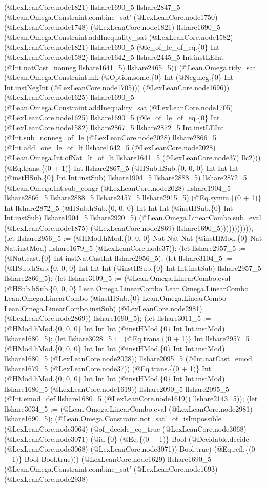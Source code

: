 \documentclass[11pt]{article}
\begin{document}
(@LexLeanCore.node1821) llshare1690\_5 llshare2847\_5 (@Lean.Omega.Constraint.combine\_sat' (@LexLeanCore.node1750) (@LexLeanCore.node1748) (@LexLeanCore.node1821) llshare1690\_5 (@Lean.Omega.Constraint.addInequality\_sat (@LexLeanCore.node1582) (@LexLeanCore.node1821) llshare1690\_5 (@le\_of\_le\_of\_eq.\{0\} Int (@LexLeanCore.node1582) llshare1642\_5 llshare2445\_5 Int.instLEInt (@Int.natCast\_nonneg llshare1641\_5) llshare2465\_5)) (@Lean.Omega.tidy\_sat (@Lean.Omega.Constraint.mk (@Option.some.\{0\} Int (@Neg.neg.\{0\} Int Int.instNegInt (@LexLeanCore.node1705))) (@LexLeanCore.node1696)) (@LexLeanCore.node1625) llshare1690\_5 (@Lean.Omega.Constraint.addInequality\_sat (@LexLeanCore.node1705) (@LexLeanCore.node1625) llshare1690\_5 (@le\_of\_le\_of\_eq.\{0\} Int (@LexLeanCore.node1582) llshare2867\_5 llshare2872\_5 Int.instLEInt (@Int.sub\_nonneg\_of\_le (@LexLeanCore.node2028) llshare2866\_5 (@Int.add\_one\_le\_of\_lt llshare1642\_5 (@LexLeanCore.node2028) (@Lean.Omega.Int.ofNat\_lt\_of\_lt llshare1641\_5 (@LexLeanCore.node37) llc2))) (@Eq.trans.\{(0 + 1)\} Int llshare2867\_5 (@HSub.hSub.\{0, 0, 0\} Int Int Int (@instHSub.\{0\} Int Int.instSub) llshare1904\_5 llshare2888\_5) llshare2872\_5 (@Lean.Omega.Int.sub\_congr (@LexLeanCore.node2028) llshare1904\_5 llshare2866\_5 llshare2888\_5 llshare2457\_5 llshare2915\_5) (@Eq.symm.\{(0 + 1)\} Int llshare2872\_5 (@HSub.hSub.\{0, 0, 0\} Int Int Int (@instHSub.\{0\} Int Int.instSub) llshare1904\_5 llshare2920\_5) (@Lean.Omega.LinearCombo.sub\_eval (@LexLeanCore.node1875) (@LexLeanCore.node2869) llshare1690\_5))))))))))); (let llshare2956\_5 := (@HMod.hMod.\{0, 0, 0\} Nat Nat Nat (@instHMod.\{0\} Nat Nat.instMod) llshare1679\_5 (@LexLeanCore.node37)); (let llshare2957\_5 := (@Nat.cast.\{0\} Int instNatCastInt llshare2956\_5); (let llshare3104\_5 := (@HSub.hSub.\{0, 0, 0\} Int Int Int (@instHSub.\{0\} Int Int.instSub) llshare2957\_5 llshare2866\_5); (let llshare3109\_5 := (@Lean.Omega.LinearCombo.eval (@HSub.hSub.\{0, 0, 0\} Lean.Omega.LinearCombo Lean.Omega.LinearCombo Lean.Omega.LinearCombo (@instHSub.\{0\} Lean.Omega.LinearCombo Lean.Omega.LinearCombo.instSub) (@LexLeanCore.node2981) (@LexLeanCore.node2869)) llshare1690\_5); (let llshare3011\_5 := (@HMod.hMod.\{0, 0, 0\} Int Int Int (@instHMod.\{0\} Int Int.instMod) llshare1680\_5); (let llshare3028\_5 := (@Eq.trans.\{(0 + 1)\} Int llshare2957\_5 (@HMod.hMod.\{0, 0, 0\} Int Int Int (@instHMod.\{0\} Int Int.instMod) llshare1680\_5 (@LexLeanCore.node2028)) llshare2095\_5 (@Int.natCast\_emod llshare1679\_5 (@LexLeanCore.node37)) (@Eq.trans.\{(0 + 1)\} Int (@HMod.hMod.\{0, 0, 0\} Int Int Int (@instHMod.\{0\} Int Int.instMod) llshare1680\_5 (@LexLeanCore.node1619)) llshare2090\_5 llshare2095\_5 (@Int.emod\_def llshare1680\_5 (@LexLeanCore.node1619)) llshare2143\_5)); (let llshare3034\_5 := (@Lean.Omega.LinearCombo.eval (@LexLeanCore.node2981) llshare1690\_5); (@Lean.Omega.Constraint.not\_sat'\_of\_isImpossible (@LexLeanCore.node3064) (@of\_decide\_eq\_true (@LexLeanCore.node3068) (@LexLeanCore.node3071) (@id.\{0\} (@Eq.\{(0 + 1)\} Bool (@Decidable.decide (@LexLeanCore.node3068) (@LexLeanCore.node3071)) Bool.true) (@Eq.refl.\{(0 + 1)\} Bool Bool.true))) (@LexLeanCore.node1629) llshare1690\_5 (@Lean.Omega.Constraint.combine\_sat' (@LexLeanCore.node1693) (@LexLeanCore.node2938) 
\end{document}
